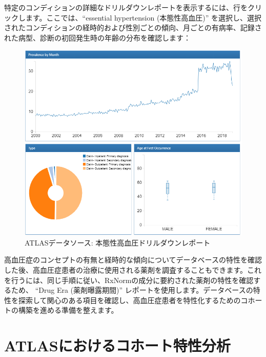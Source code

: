 \documentclass[
  11pt]{book}
\theoremstyle{definition}
\theoremstyle{definition}
\theoremstyle{definition}
\theoremstyle{definition}
\theoremstyle{remark}
\begin{document}
特定のコンディションの詳細なドリルダウンレポートを表示するには、行をクリックします。ここでは、``essential hypertension (本態性高血圧)'' を選択し、選択されたコンディションの経時的および性別ごとの傾向、月ごとの有病率、記録された病型、診断の初回発生時の年齢の分布を確認します：

\begin{figure}

{\centering \includegraphics[width=1\linewidth]{images/Characterization/atlasDataSourcesDrillDownReport} 

}

\caption{ATLASデータソース: 本態性高血圧ドリルダウンレポート}\label{fig:atlasDataSourcesDrillDownReport}
\end{figure}

高血圧症のコンセプトの有無と経時的な傾向についてデータベースの特性を確認した後、高血圧症患者の治療に使用される薬剤を調査することもできます。これを行うには、同じ手順に従い、RxNormの成分に要約された薬剤の特性を確認するため、 ``Drug Era (薬剤曝露期間)'' レポートを使用します。データベースの特性を探索して関心のある項目を確認し、高血圧症患者を特性化するためのコホートの構築を進める準備を整えます。

\section{ATLASにおけるコホート特性分析}\label{atlasux306bux304aux3051ux308bux30b3ux30dbux30fcux30c8ux7279ux6027ux5206ux6790}
\end{document}
